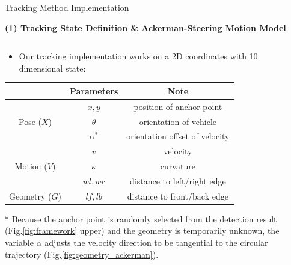 \documentclass[final,hyperref={pdfpagelabels=false}]{beamer}
\begin{document}
\begin{frame}[t]
\begin{columns}[t]
\begin{column}{.48\textwidth}
\begin{block}{Tracking Method Implementation}
\begin{center}
\textbf{(1) Tracking State Definition \& Ackerman-Steering Motion Model}
\end{center}
\begin{columns}[t]
	\begin{column}{0.48\textwidth}
	\begin{itemize}
	\item Our tracking implementation works on a 2D coordinates with 10 dimensional state:
	\end{itemize}
		\begin{table}
			\centering
			\begin{tabular}{|c|c|c|}
			\hline
			             & \bf{Parameters} & \bf{Note} \\
			\hline
			             & $x,y$ & position of anchor point\\
			\cline{2-3}
			Pose ($X$)   & $\theta$ & orientation of vehicle \\
			\hline
			             & $\alpha^*$ & orientation offset of velocity \\
			\cline{2-3}             
			             & $v$ & velocity \\
			\cline{2-3}
			Motion ($V$) & $\kappa$ & curvature \\
			\hline
			             & $wl,wr$  & distance to left/right edge \\
			\cline{2-3}
			Geometry ($G$) & $lf,lb$  & distance to front/back edge \\
			\hline
			\end{tabular}
			\end{table}
	* Because the anchor point is randomly selected from the detection result (Fig.\ref{fig:framework} upper) and the geometry is temporarily unknown, the variable $\alpha$ adjusts the velocity direction to be tangential to the circular trajectory (Fig.\ref{fig:geometry_ackerman}).
	\end{column}
	\begin{column}{0.48\textwidth}
	\begin{figure}
	 \centering

\end{figure}
\end{column}
\end{columns}
\end{block}
\end{column}
\end{columns}
\end{frame}
\end{document}
